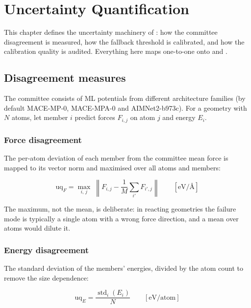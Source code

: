 \chapter{Uncertainty Quantification}
\label{ch:uncertainty}

This chapter defines the uncertainty machinery of \jns{}: how the committee
disagreement is measured, how the fallback threshold is calibrated, and how
the calibration quality is audited.  Everything here maps one-to-one onto
 and .

\section{Disagreement measures}

The committee consists of ML potentials from different architecture
families (by default MACE-MP-0, MACE-MPA-0 and AIMNet2-b973c).  For a
geometry with $N$ atoms, let member $i$ predict forces $F_{i,j}$ on atom $j$
and energy $E_i$.

\subsection{Force disagreement}

The per-atom deviation of each member from the committee mean force is
mapped to its vector norm and maximised over all atoms and members:

\begin{equation}
  \mathrm{uq}_F
  = \max_{i,\,j}\;
    \left\lVert F_{i,j}
      - \frac{1}{M}\sum_{i'} F_{i',j} \right\rVert
  \qquad [\mathrm{eV}/\text{\AA}]
  \label{eq:uqf}
\end{equation}

The maximum, not the mean, is deliberate: in reacting geometries the
failure mode is typically a single atom with a wrong force direction, and a
mean over atoms would dilute it.

\subsection{Energy disagreement}

The standard deviation of the members' energies, divided by the atom count
to remove the size dependence:

\begin{equation}
  \mathrm{uq}_E = \frac{\operatorname{std}_i(E_i)}{N}
  \qquad [\mathrm{eV}/\mathrm{atom}]
  \label{eq:uqe}
\end{equation}

